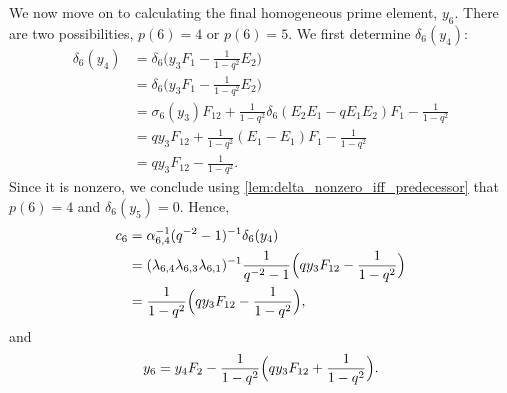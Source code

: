 \begin{example}
	We now move on to calculating the final homogeneous prime element, $y_6$. There are two
	possibilities, $p(6) = 4$ or $p(6) = 5$. We first determine $\delta_6(y_4)$:
	\begin{align*}
		\delta_6(y_4)
		 & = \delta_6\bigl(y_3F_1- \frac{1}{1-q^2}E_2\bigr)                                        \\
		 & = \delta_6\bigl(y_3F_1- \frac{1}{1-q^2}E_2\bigr)                                        \\
		 & = \sigma_6(y_3)F_{12} + \frac{1}{1-q^2}\delta_6(E_2E_1 - q E_1 E_2)F_1- \frac{1}{1-q^2} \\
		 & = qy_3F_{12} + \frac{1}{1-q^2}(E_1 - E_1)F_1- \frac{1}{1-q^2}                           \\
		 & = qy_3F_{12} - \frac{1}{1-q^2}.
	\end{align*}
	Since it is nonzero, we conclude using \cref{lem:delta_nonzero_iff_predecessor} that
	$p(6) = 4$ and $\delta_6(y_5) = 0$. Hence,
	\begin{align*}
		c_6
		 & = \alpha_{6, 4}^{-1} (q^{-2} - 1)^{-1} \delta_6(y_4)                                                             \\
		 & = (\lambda_{6,4}\lambda_{6,3}\lambda_{6,1})^{-1} \frac{1}{q^{-2} - 1}\Bigl(q y_3 F_{12} - \frac{1}{1-q^2}\Bigr) \\
		 & = \frac{1}{1 -q^{2}}\Bigl(q y_3 F_{12} - \frac{1}{1-q^2}\Bigr),
	\end{align*}
	and
	\begin{equation*}
		y_6 = y_4 F_2 - \frac{1}{1-q^2}\Bigl(q y_3 F_{12} + \frac{1}{1-q^2}\Bigr).
	\end{equation*}


\end{example}

